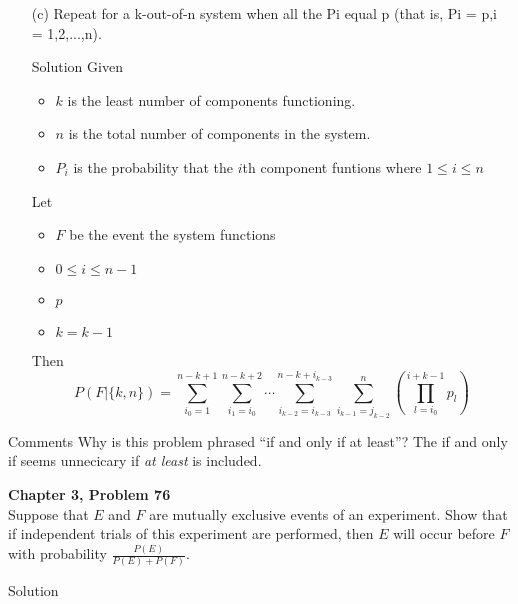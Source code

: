 \documentclass{article}
\begin{document}
\begin{spacing}{1.1}
\begin{homeworkProblem}
\begin{enumerate}[(a)]
\begin{homeworkSection}{Solution}
      \end{homeworkSection}
    \item[(c)] Repeat for a k-out-of-n system when all the Pi equal p (that is, Pi = p,i = 1,2,...,n).
      \begin{homeworkSection}{Solution}
        Given
          \begin{itemize}
            \item $k$ is the least number of components functioning.
            \item $n$ is the total number of components in the system.
            \item $P_i$ is the probability that the $i$th component funtions where $ 1 \le i \le n$
          \end{itemize}
        Let
          \begin{itemize}
            \item $F$ be the event the system functions
            \item $0 \le i \le n - 1$
            \item $p$
            \item $k = k - 1$
          \end{itemize}
        Then
          \[P( F|\{k,n\}) = \sum\limits_{i_0 = 1}^{n - k + 1}{ \sum\limits_{i_1 = i_0}^{n - k + 2}{ \cdots \sum\limits_{i_{k - 2} = i_{k - 3}}^{n - k + i_{k - 3}}{ \sum\limits_{i_{k - 1} = j_{k - 2}}^{n}{ \left(\prod\limits_{l = i_0}^{i + k - 1}{ p_l}\right)}}}}\]
      \end{homeworkSection}
  \end{enumerate}
      \begin{homeworkSection}{Comments}
        Why is this problem phrased ``if and only if at least''?  The if and only if seems unnecicary if \emph{at least} is included.
      \end{homeworkSection}
\end{homeworkProblem}
\newpage
\begin{homeworkProblem}
  {\bf Chapter 3, Problem 76}\\
  Suppose that $E$ and $F$ are mutually exclusive events of an experiment. 
  Show that if independent trials of this experiment are performed, 
  then $E$ will occur before $F$ with probability $\frac{ P( E)}{P( E) + P( F)}.$
  \begin{homeworkSection}{Solution}
    
    
  \end{homeworkSection}
\end{homeworkProblem}
\end{spacing}
\end{document}
